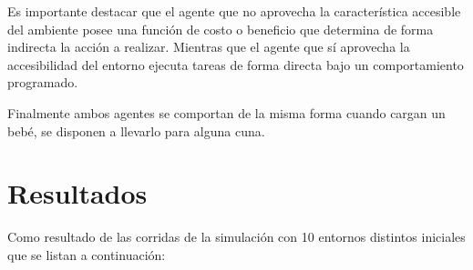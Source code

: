 \documentclass[a4paper,10pt,twocolumn]{article}
\begin{document}
	Es importante destacar que el agente que no aprovecha la característica accesible del ambiente posee una función de costo o beneficio que determina de forma indirecta la acción a realizar. Mientras que el agente que sí aprovecha la accesibilidad del entorno ejecuta tareas de forma directa bajo un comportamiento programado.
	
	Finalmente ambos agentes se comportan de la misma forma cuando cargan un bebé, se disponen a llevarlo para alguna cuna.
	
\section{Resultados}

	Como resultado de las corridas de la simulación con 10 entornos distintos iniciales que se listan a continuación:
	
\end{document}
